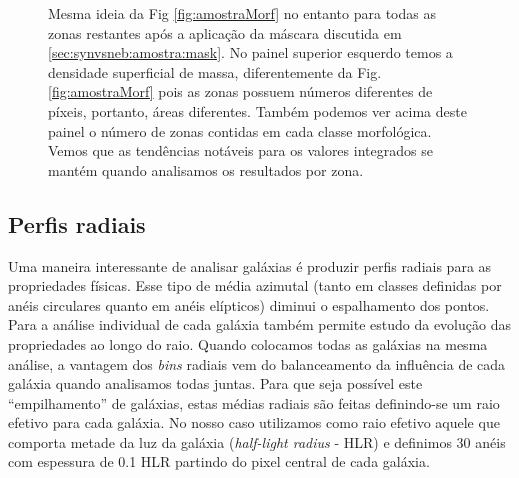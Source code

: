 \begin{figure}
	\centering
	\caption[Classificação por morfologia após máscara.]
	{Mesma ideia da Fig \ref{fig:amostraMorf} no entanto para todas as zonas restantes após a
	aplicação da máscara discutida em \ref{sec:synvsneb:amostra:mask}. No painel superior esquerdo
	temos a densidade superficial de massa, diferentemente da Fig. \ref{fig:amostraMorf} pois as zonas
	possuem números diferentes de píxeis, portanto, áreas diferentes. Também podemos ver acima deste
	painel o número de zonas contidas em cada classe morfológica. Vemos que as tendências notáveis para
	os valores integrados se mantém quando analisamos os resultados por zona.}
	\label{fig:amostraRealMorf}
\end{figure}

\subsection{Perfis radiais}
\label{sec:synvsneb:amostra:rad}

Uma maneira interessante de analisar galáxias é produzir perfis radiais para as propriedades
físicas. Esse tipo de média azimutal (tanto em classes definidas por anéis circulares quanto em
anéis elípticos) diminui o espalhamento dos pontos. Para a análise individual de cada galáxia também
permite estudo da evolução das propriedades ao longo do raio. Quando colocamos todas as galáxias na
mesma análise, a vantagem dos {\em bins} radiais vem do balanceamento da influência de cada galáxia
quando analisamos todas juntas. Para que seja possível este ``empilhamento'' de galáxias, estas
médias radiais são feitas definindo-se um raio efetivo para cada galáxia. No nosso caso utilizamos
como raio efetivo aquele que comporta metade da luz da galáxia ({\em half-light radius} - HLR) e
definimos 30 anéis com espessura de 0.1 HLR partindo do pixel central de cada galáxia. 

